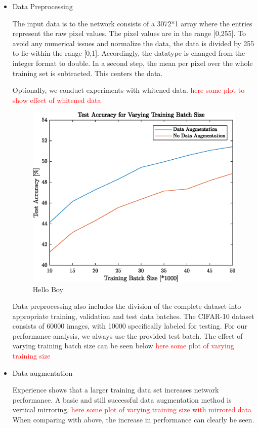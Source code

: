 \begin{itemize}
   	\item Data Preprocessing

  	The input data is to the network consists of a 3072*1 array where the entries represent the raw pixel values. The pixel values are in the range [0,255]. To avoid any numerical issues and normalize the data, the data is divided by 255 to lie within the range [0,1]. Accordingly, the datatype is changed from the integer format to double. In a second step, the mean per pixel over the whole training set is subtracted. This centers the data.

  	Optionally, we conduct experiments with whitened data. \textcolor{red}{here some plot to show effect of whitened data}

  	\begin{figure}[h!]
  		\centering
  		\includegraphics{images/dataAugmentation}
  		\caption{Hello Boy}
  		\label{fig:test1}
  	\end{figure}



  	Data preprocessing also includes the division of the complete dataset into appropriate training, validation and test data batches. The CIFAR-10 dataset consists of 60000 images, with 10000 specifically labeled for testing. For our performance analysis, we always use the provided test batch. The effect of varying training batch size can be seen below \textcolor{red}{here some plot of varying training size}

   	\item Data augmentation

   	Experience shows that a larger training data set increases network performance. A basic and still successful data augmentation method is vertical mirroring. \textcolor{red}{here some plot of varying training size with mirrored data} When comparing with above, the increase in performance can clearly be seen.

\end{itemize}

